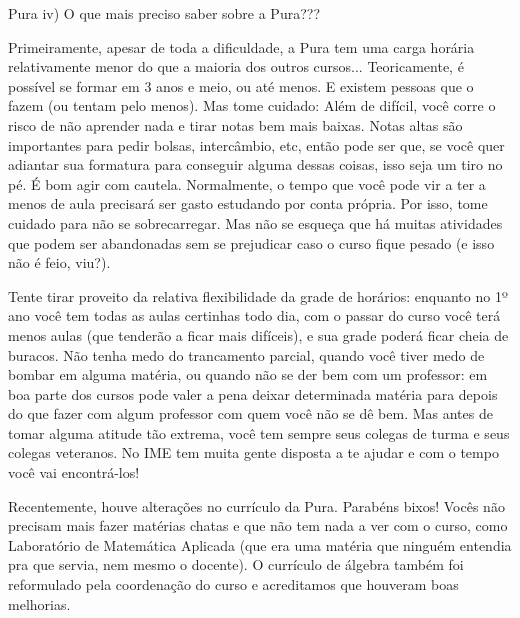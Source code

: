 \begin{subsecao}{Pura}
iv) O que mais preciso saber sobre a Pura???

Primeiramente, apesar de toda a dificuldade, a Pura tem uma carga horária
relativamente menor do que a maioria dos outros cursos... Teoricamente, é
possível se formar em 3 anos e meio, ou até menos. E existem pessoas que o
fazem (ou tentam pelo menos). Mas tome cuidado: Além de difícil, você
corre o risco de não aprender nada e tirar notas bem mais baixas. Notas altas
são importantes para pedir bolsas, intercâmbio, etc, então pode ser que, se você
quer adiantar sua formatura para conseguir alguma dessas coisas, isso seja um
tiro no pé. É bom agir com cautela. Normalmente, o tempo que você pode vir a ter
a menos de aula precisará ser gasto estudando por conta própria. Por isso, tome
cuidado para não se sobrecarregar. Mas não se esqueça que há muitas atividades
que podem ser abandonadas sem se prejudicar caso o curso fique pesado (e isso não é feio, viu?).

Tente tirar proveito da relativa flexibilidade da grade de horários: enquanto
no 1º ano você tem todas as aulas certinhas todo dia, com o passar do
curso você terá menos aulas (que tenderão a ficar mais difíceis), e sua
grade poderá ficar cheia de buracos. Não tenha medo do trancamento parcial,
quando você tiver medo de bombar em alguma matéria, ou quando não se der bem com
um professor: em boa parte dos cursos pode valer a pena deixar determinada
matéria para depois do que fazer com algum professor com quem você não se dê
bem. Mas antes de tomar alguma atitude tão extrema, você tem sempre seus colegas
de turma e seus colegas veteranos. No IME tem muita gente disposta a te ajudar e
com o tempo você vai encontrá-los!




Recentemente, houve alterações no currículo da Pura. Parabéns bixos! Vocês não
precisam mais fazer matérias chatas e que não tem nada a ver com o curso, como
Laboratório de Matemática Aplicada (que era uma matéria que ninguém entendia pra que servia, nem mesmo o docente). O currículo de álgebra também foi reformulado pela coordenação do curso e acreditamos que houveram boas melhorias.


\end{subsecao}
